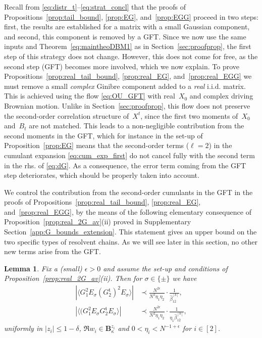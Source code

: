 \documentclass[10pt]{amsart}
\newtheorem{lemma}[theorem]{Lemma}
\numberwithin{equation}{section}
\newcommand{\mt}{\mathfrak{t}}
\begin{document}
Recall from \eqref{eq:distr_t}--\eqref{eq:strat_concl} that the proofs of Propositions~\ref{prop:tail_bound}, \ref{prop:EG}, and~\ref{prop:EGG} proceed in two steps: first, the results are established for a matrix with a small Gaussian component, and second, this component is removed by a GFT. Since we now use the same inputs \cite[Proposition~4.6]{bourgade2024fluctuations} and Theorem~\ref{eq:maintheoDBM1} as in Section~\ref{sec:proofprop}, the first step of this strategy does not change. However, this does not come for free, as the second step (GFT) becomes more involved, which we now explain. To prove Propositions~\ref{prop:real_tail_bound}, \ref{prop:real_EG}, and~\ref{prop:real_EGG} we must remove a small \emph{complex} Ginibre component added to a \emph{real} i.i.d. matrix. This is achieved using the flow \eqref{eq:OU_GFT} with real~$X_0$ and complex driving Brownian motion. Unlike in Section~\ref{sec:proofprop}, this flow does not preserve the second-order correlation structure of~$X^t$, since the first two moments of~$X_0$ and~$B_t$ are not matched. This leads to a non-negligible contribution from the second moments in the GFT, which for instance in the set-up of Proposition~\ref{prop:EG} means that the second-order terms ($\ell=2$) in the cumulant expansion \eqref{eq:cum_exp_first} do not cancel fully with the second term in the rhs. of \eqref{eq:dG}. As a consequence, the error term coming from the GFT step deteriorates, which should be properly taken into account.

We control the contribution from the second-order cumulants in the GFT in the proofs of Propositions~\ref{prop:real_tail_bound}, \ref{prop:real_EG}, and~\ref{prop:real_EGG}, by the means of the following elementary consequence of Proposition~\ref{prop:real_2G_av}(ii) proved in Supplementary Section~\ref{app:G_bounds_extension}. This statement gives an upper bound on the two specific types of resolvent chains. As we will see later in this section, no other new terms arise from the GFT.

\begin{lemma}\label{lem:G_bounds_extension} Fix a (small) $\epsilon>0$ and assume the set-up and conditions of Proposition~\ref{prop:real_2G_av}(ii). Then for $\sigma\in\{\pm\}$ we have
\begin{align}
\left\vert\langle G_1^2 E_\sigma (G_2^\mt)^2E_\sigma \rangle\right\vert &\prec \frac{N^{2\epsilon}}{N^2\eta_1\eta_2}\cdot \frac{1}{\widehat{\beta}^{[b]}_{1\overline{2}}},\label{eq:real_size_bound1}\\
\left\vert\langle (G_1^2 E_\sigma G_2^\mt E_\sigma \rangle\right\vert &\prec \frac{N^{2\epsilon}}{N^2\eta_1\eta_2}\cdot\frac{1}{\eta_1\widehat{\beta}^{[b]}_{1\overline{2}}},\label{eq:real_size_bound2}
\end{align}
uniformly in $|z_i|\le 1-\delta$, $\Re w_i\in\mathbf{B}_\kappa^{z_i}$ and $0<\eta_i<N^{-1+\epsilon}$ for $i\in[2]$. 
\end{lemma}
\end{document}
